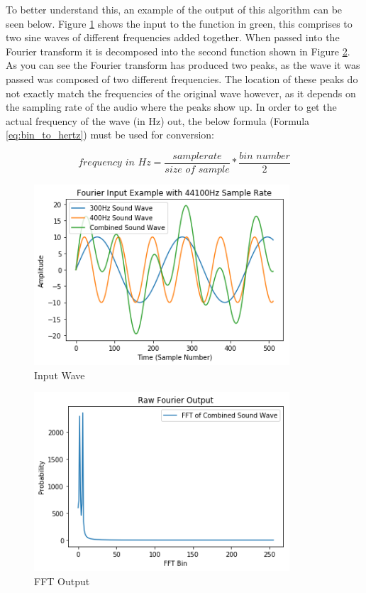 \documentclass[12pt]{report}
\begin{document}
To better understand this, an example of the output of this algorithm can be seen below. Figure \ref{graph_in} shows the input to the function in green, this comprises to two sine waves of different frequencies added together. When passed into the Fourier transform it is decomposed into the second function shown in Figure \ref{graph_out1}. As you can see the Fourier transform has produced two peaks, as the wave it was passed was composed of two different frequencies. The location of these peaks do not exactly match the frequencies of the original wave however, as it depends on the sampling rate of the audio where the peaks show up. In order to get the actual frequency of the wave (in Hz) out, the below formula (Formula \ref{eq:bin_to_hertz}) must be used for conversion:

\begin{equation}
    \textit{frequency in Hz} = \frac{\textit{samplerate}}{\textit{size of sample}} * \frac{\textit{bin number}}{2}
    \label{eq:bin_to_hertz}
\end{equation}


\begin{figure}[H]
	\centering
    \includegraphics[width=0.85\textwidth]{input.png}
	\caption{Input Wave}\label{graph_in}
	\centering
\end{figure}

\begin{figure}[H]
	\centering
    \includegraphics[width=0.85\textwidth]{output_raw.png}
	\caption{FFT Output}\label{graph_out1}
	\centering
\end{figure}
\end{document}

